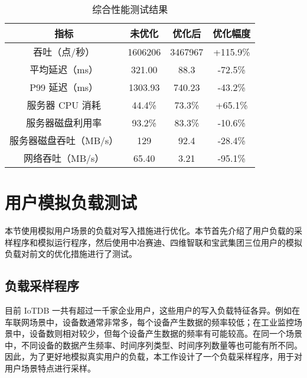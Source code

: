 \begin{table}
  \centering
  \caption{综合性能测试结果}
  \begin{tabular}{cccc}
    \toprule 
    指标 &  未优化  & 优化后 & 优化幅度 \\
    \midrule
    吞吐（点/秒） & 1606206 & 3467967 & +115.9\% \\
    平均延迟（ms） & 321.00 & 88.3 & -72.5\% \\
    P99 延迟（ms） & 1303.93 & 740.23 & -43.2\% \\
    服务器 CPU 消耗 & 44.4\% & 73.3\% & +65.1\% \\
    服务器磁盘利用率 & 93.2\% & 83.3\% & -10.6\% \\
    服务器磁盘吞吐（MB/s） & 129 & 92.4 & -28.4\% \\
    网络吞吐（MB/s） & 65.40 & 3.21 & -95.1\% \\
\bottomrule
  \end{tabular}
  \label{tabular:columnar-serialization-performance-vs-origin}
\end{table}

\section{用户模拟负载测试}
本节使用模拟用户场景的负载对写入措施进行优化。本节首先介绍了用户负载的采样程序和模拟运行程序，然后使用中冶赛迪、四维智联和宝武集团三位用户的模拟负载对前文的优化措施进行了测试。
\subsection{负载采样程序}
目前 IoTDB 一共有超过一千家企业用户，这些用户的写入负载特征各异。例如在车联网场景中，设备数通常非常多，每个设备产生数据的频率较低；在工业监控场景中，设备数则相对较少，但每个设备产生数据的频率有可能较高。在同一个场景中，不同设备的数据产生频率、时间序列类型、时间序列数量等也可能有所不同。因此，为了更好地模拟真实用户的负载，本工作设计了一个负载采样程序，用于对用户场景特点进行采样。

